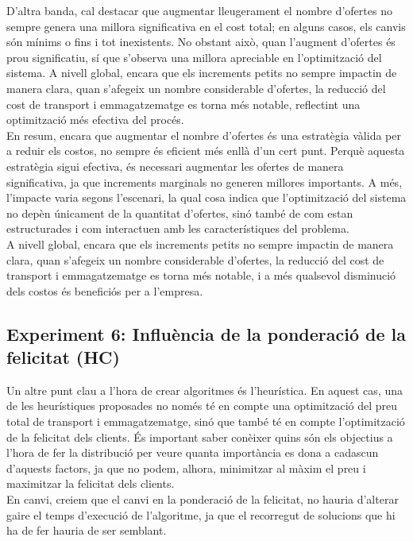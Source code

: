 \documentclass[a4paper]{article}
\begin{document}
	D'altra banda, cal destacar que augmentar lleugerament el nombre d'ofertes no sempre genera una millora significativa en el cost total; en alguns casos, els canvis són mínims o fins i tot inexistents. No obstant això, quan l'augment d'ofertes és prou significatiu, sí que s'observa una millora apreciable en l'optimització del sistema. A nivell global, encara que els increments petits no sempre impactin de manera clara, quan s'afegeix un nombre considerable d'ofertes, la reducció del cost de transport i emmagatzematge es torna més notable, reflectint una optimització més efectiva del procés. \\
	
	En resum, encara que augmentar el nombre d'ofertes és una estratègia vàlida per a reduir els costos, no sempre és eficient més enllà d'un cert punt. Perquè aquesta estratègia sigui efectiva, és necessari augmentar les ofertes de manera significativa, ja que increments marginals no generen millores importants. A més, l'impacte varia segons l'escenari, la qual cosa indica que l'optimització del sistema no depèn únicament de la quantitat d'ofertes, sinó també de com estan estructurades i com interactuen amb les característiques del problema. \\
	
	A nivell global, encara que els increments petits no sempre impactin de manera clara, quan s'afegeix un nombre considerable d'ofertes, la reducció del cost de transport i emmagatzematge es torna més notable, i a més qualsevol disminució dels costos és beneficiós per a l'empresa.
	
	\subsection{Experiment 6: Influència de la ponderació de la felicitat (HC)}
	
	Un altre punt clau a l'hora de crear algoritmes és l'heurística. En aquest cas, una de les heurístiques proposades no només té en compte una optimització del preu total de transport i emmagatzematge, sinó que també té en compte l'optimització de la felicitat dels clients. És important saber conèixer quins són els objectius a l'hora de fer la distribució per veure quanta importància es dona a cadascun d'aquests factors, ja que no podem, alhora, minimitzar al màxim el preu i maximitzar la felicitat dels clients. \\
	
	En canvi, creiem que el canvi en la ponderació de la felicitat, no hauria d'alterar gaire el temps d'execució de l'algoritme, ja que el recorregut de solucions que hi ha de fer hauria de ser semblant. \\
	
\end{document}
